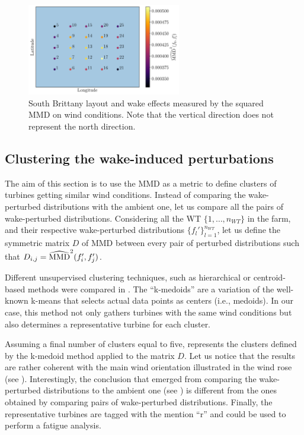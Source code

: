 \begin{figure}
    \centering
    \includegraphics[width=0.6\textwidth]{part2/figures/WAKE/wake_perturbation_SB.png}
    \caption{South Brittany layout and wake effects measured by the squared MMD on wind conditions. 
    Note that the vertical direction does not represent the north direction.}
    \label{fig:FIGWakeEffect}
\end{figure}

\subsection{Clustering the wake-induced perturbations}

The aim of this section is to use the MMD as a metric to define clusters of turbines getting similar wind conditions. 
Instead of comparing the wake-perturbed distributions with the ambient one, let us compare all the pairs of wake-perturbed distributions. 
Considering all the WT $\{1, \dots, n_{WT}\}$ in the farm, and their respective wake-perturbed distributions $\{f_l'\}_{l=1}^{n_{WT}}$, let us define the symmetric matrix $D$ of MMD between every pair of perturbed distributions such that $D_{i, j} = \widehat{\mathrm{MMD}}^2(f_i', f_j')$. 

Different unsupervised clustering techniques, such as hierarchical or centroid-based methods were compared in \citet{lovera_fekhari_2023}. 
The ``k-medoids'' \citep{park_2009} are a variation of the well-known k-means that selects actual data points as centers (i.e., medoids). 
In our case, this method not only gathers turbines with the same wind conditions but also determines a representative turbine for each cluster. 

Assuming a final number of clusters equal to five,  represents the clusters defined by the k-medoid method applied to the matrix $D$. 
Let us notice that the results are rather coherent with the main wind orientation illustrated in the wind rose (see ). 
Interestingly, the conclusion that emerged from comparing the wake-perturbed distributions to the ambient one (see ) is different from the ones obtained by comparing pairs of wake-perturbed distributions. 
Finally, the representative turbines are tagged with the mention ``r'' and could be used to perform a fatigue analysis. 


